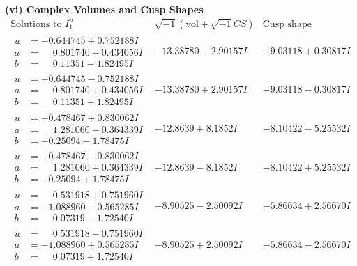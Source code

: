 \documentclass[1p]{elsarticle_modified}
\theoremstyle{definition}
\newcommand{\I}{\sqrt{-1}}
\begin{document}
\newpage\flushleft \textbf{(vi) Complex Volumes and Cusp Shapes}
$$\begin{array}{c|c|c}  
\text{Solutions to }I^u_{1}& \I (\text{vol} + \sqrt{-1}CS) & \text{Cusp shape}\\
 \hline 
\begin{aligned}
u &= -0.644745 + 0.752188 I \\
a &= \phantom{-}0.801740 - 0.434056 I \\
b &= \phantom{-}0.11351 - 1.82495 I\end{aligned}
 & -13.38780 - 2.90157 I & -9.03118 + 0.30817 I \\ \hline\begin{aligned}
u &= -0.644745 - 0.752188 I \\
a &= \phantom{-}0.801740 + 0.434056 I \\
b &= \phantom{-}0.11351 + 1.82495 I\end{aligned}
 & -13.38780 + 2.90157 I & -9.03118 - 0.30817 I \\ \hline\begin{aligned}
u &= -0.478467 + 0.830062 I \\
a &= \phantom{-}1.281060 - 0.364339 I \\
b &= -0.25094 - 1.78475 I\end{aligned}
 & -12.8639 + 8.1852 I & -8.10422 - 5.25532 I \\ \hline\begin{aligned}
u &= -0.478467 - 0.830062 I \\
a &= \phantom{-}1.281060 + 0.364339 I \\
b &= -0.25094 + 1.78475 I\end{aligned}
 & -12.8639 - 8.1852 I & -8.10422 + 5.25532 I \\ \hline\begin{aligned}
u &= \phantom{-}0.531918 + 0.751960 I \\
a &= -1.088960 - 0.565285 I \\
b &= \phantom{-}0.07319 - 1.72540 I\end{aligned}
 & -8.90525 - 2.50092 I & -5.86634 + 2.56670 I \\ \hline\begin{aligned}
u &= \phantom{-}0.531918 - 0.751960 I \\
a &= -1.088960 + 0.565285 I \\
b &= \phantom{-}0.07319 + 1.72540 I\end{aligned}
 & -8.90525 + 2.50092 I & -5.86634 - 2.56670 I \\ \hline\begin{aligned}

\end{aligned}
\end{array}$$
\end{document}
